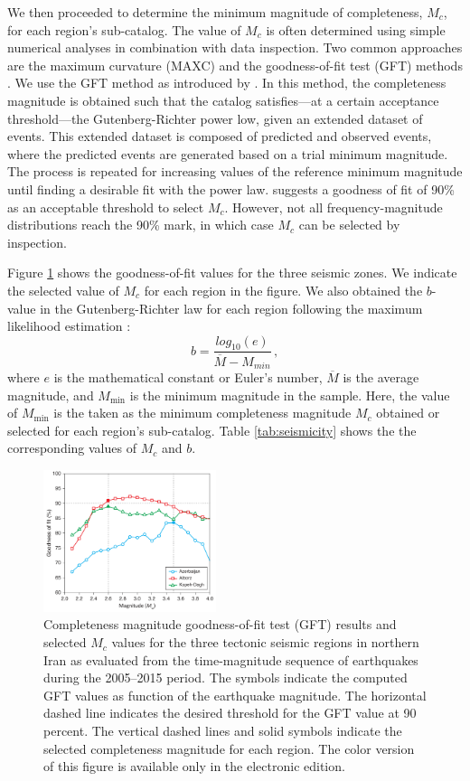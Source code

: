 We then proceeded to determine the minimum magnitude of completeness, $M_c$, for each region's sub-catalog. The value of $M_c$ is often determined using simple numerical analyses in combination with data inspection. Two common approaches are the maximum curvature (MAXC) and the goodness-of-fit test (GFT) methods \citep{Wiemer2001}. We use the GFT method as introduced by \citet{Wiemer2000}. In this method, the completeness magnitude is obtained such that the catalog satisfies---at a certain acceptance threshold---the Gutenberg-Richter power low, given an extended dataset of events. This extended dataset is composed of predicted and observed events, where the predicted events are generated based on a trial minimum magnitude. The process is repeated for increasing values of the reference minimum magnitude until finding a desirable fit with the power law. \citet{Wiemer2000} suggests a goodness of fit of 90\% as an acceptable threshold to select $M_c$. However, not all frequency-magnitude distributions reach the 90\% mark, in which case $M_c$ can be selected by inspection. 

Figure \ref{fig:completeness} shows the goodness-of-fit values for the three seismic zones. We indicate the selected value of $M_c$ for each region in the figure. We also obtained the $b$-value in the Gutenberg-Richter law for each region following the maximum likelihood estimation \citep{Aki1965}:
% 
\begin{equation}
	b = \frac{log_{10}(e)}{\overline{M} - M_{min}} \, ,
\end{equation}
% 
where $e$ is the mathematical constant or Euler's number, $\overline{M}$ is the average magnitude, and $M_{\min}$ is the minimum magnitude in the sample. Here, the value of $M_{\min}$ is the taken as the minimum completeness magnitude $M_c$ obtained or selected for each region's sub-catalog. Table \ref{tab:seismicity} shows the the corresponding values of $M_c$ and $b$.

\begin{figure}%
	\centering
	\includegraphics[width=0.45\textwidth]{figures/pdf/figure-04} 
	\caption{Completeness magnitude goodness-of-fit test (GFT) results and selected $M_c$ values for the three tectonic seismic regions in northern Iran as evaluated from the time-magnitude sequence of earthquakes during the 2005--2015 period. The symbols indicate the computed GFT values as function of the earthquake magnitude. The horizontal dashed line indicates the desired threshold for the GFT value at 90 percent. The vertical dashed lines and solid symbols indicate the selected completeness magnitude for each region. The color version of this figure is available only in the electronic edition.}
	\label{fig:completeness}
\end{figure} 

